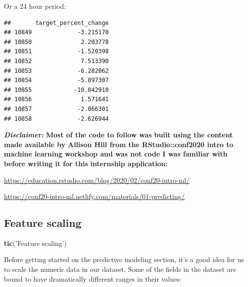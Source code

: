 \documentclass[
]{book}
\newenvironment{Shaded}{\begin{snugshade}}{\end{snugshade}}
\newcommand{\DataTypeTok}[1]{\textcolor[rgb]{0.13,0.29,0.53}{#1}}
\newcommand{\DecValTok}[1]{\textcolor[rgb]{0.00,0.00,0.81}{#1}}
\newcommand{\KeywordTok}[1]{\textcolor[rgb]{0.13,0.29,0.53}{\textbf{#1}}}
\newcommand{\NormalTok}[1]{#1}
\newcommand{\OperatorTok}[1]{\textcolor[rgb]{0.81,0.36,0.00}{\textbf{#1}}}
\newcommand{\StringTok}[1]{\textcolor[rgb]{0.31,0.60,0.02}{#1}}
\begin{document}
Or a 24 hour period:

\begin{Shaded}
\end{Shaded}

\begin{verbatim}
##       target_percent_change
## 10849             -3.215170
## 10850              2.203778
## 10851             -1.520398
## 10852              7.513390
## 10853             -6.282062
## 10854             -5.897307
## 10855            -10.042910
## 10856              1.571641
## 10857             -2.066301
## 10858             -2.626944
\end{verbatim}

\textbf{\emph{Disclaimer:}} \textbf{Most of the code to follow was built using the content made available by Allison Hill from the RStudio::conf2020 intro to machine learning workshop and was not code I was familiar with before writing it for this internship application:}

\url{https://education.rstudio.com/blog/2020/02/conf20-intro-ml/}

\url{https://conf20-intro-ml.netlify.com/materials/01-predicting/}

\hypertarget{feature-scaling}{%
\subsection{Feature scaling}\label{feature-scaling}}

\begin{Shaded}
\begin{Highlighting}[]
\KeywordTok{tic}\NormalTok{(}\StringTok{'Feature scaling'}\NormalTok{)}
\end{Highlighting}
\end{Shaded}

Before getting started on the predictive modeling section, it's a good idea for us to scale the numeric data in our dataset. Some of the fields in the dataset are bound to have dramatically different ranges in their values:

\begin{Shaded}
\end{Shaded}
\end{document}
